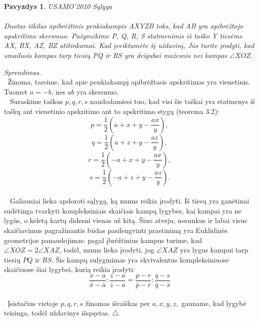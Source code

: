\documentclass[11pt,a4paper,twoside]{book}
\newenvironment{sprendimas}{\noindent \textit{Sprendimas.}}{\hfill $\triangle$}
\newcounter{foo}[subsection]
\newtheorem{pavnr}[foo]{Pavyzdys}
\theoremstyle{definition} \newtheorem*{api}{Apibrėžimas}
\theoremstyle{remark} \newtheorem*{pastaba}{Pastaba}
\begin{document}
\begin{pavnr}
USAMO'2010 Sąlyga
\\
   \\Duotas iškilas apibrėžtinis penkiakampis AXYZB toks, kad AB yra apibrėžtojo apskritimo
   skersmuo. Pažymėkime P, Q, R, S statmenimis iš taško Y tiesėms  AX, BX, AZ, BZ atitinkamai.
   Kad įveiktumėte šį uždavinį, Jūs turite įrodyti, kad smailusis kampas tarp tiesių PQ ir RS
   yra dvigubai mažesnis nei kampas $ \angle XOZ$.
\end{pavnr}
\begin{sprendimas}
  \\ $\phantom{a}$Žinoma, tarsime, kad apie penkiakampį apibrėžtasis apskritimas yra vienetinis.
      Tuomet $a = -b$, nes $ab$ yra skersmuo.
  \\ $\phantom{a}$
Suraskime taškus $p, q, r, s$ naudodamiesi tuo, kad visi šie taškai yra statmenys iš taškų ant vienetinio apskritimo
ant to apskritimo stygų (teorema 3.2):
     $$p = \frac {1}{2}( a+x+y- \frac {ax}{y}),$$
     $$q = \frac {1}{2}( a+z+y- \frac {az}{y}),$$ 
     $$r = \frac {1}{2}( -a+x+y- \frac {ax}{y}),$$
     $$s = \frac {1}{2}( -a+z+y- \frac {az}{y}).$$
  \\ $\phantom{a}$ Galiausiai lieka apdoroti sąlygą, ką mums reikia įrodyti. Iš tiesų yra
      ganėtinai sudėtinga tvarkyti kompleksiniais skaičiais kampų lygybes, 
      kai kampai yra ne lygūs, o keletą kartų didesni vienas už kitą.
      Šiuo atveju, nesunkus ir labai visus skaičiavimus pagražinantis būdas
      pasilengvinti prastinimą yra Euklidinės geometrijos panaudojimas: pagal
      įbrėžtinius kampus turime, kad $ \angle XOZ = 2 \angle XAZ$, todėl,
      mums lieka įrodyti, jog  $ \angle XAZ $ yra lygus kampui tarp tiesių $PQ$ ir
      $RS$. Šis kampų sulyginimas yra ekvivalentus kompleksiniuose skaičiuose šiai lygybei, kurią reikia įrodyti: 
$$\frac {x-a} {\bar x - \bar a} : \frac{z-a}{\bar z - \bar a} = \frac{p-r}{\bar p - \bar r} : \frac{q-s}{\bar q - \bar s}$$
  \\ $\phantom{a}$Įsistačius vietoje $p, q, r, s$ žinomas išraiškas per $a, x, y, z,$ gauname, kad 
   lygybė teisinga, todėl uždavinys išspęstas.
     \end{sprendimas}
     
\end{document}
